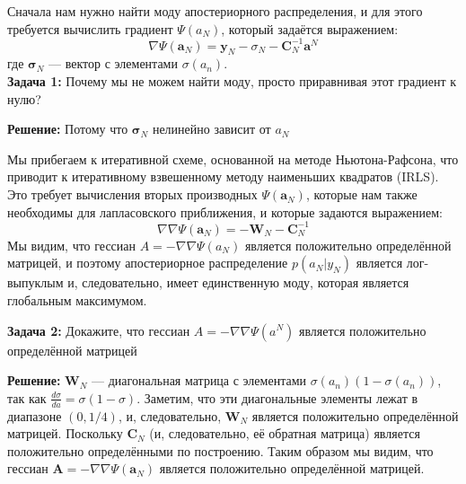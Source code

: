 {Сначала нам нужно найти моду апостериорного распределения, и для этого требуется вычислить градиент $\Psi(a_N)$, который задаётся выражением:
\[
    \nabla \Psi(\mathbf{a}_N) = \mathbf{y}_N - \sigma_{N} - \mathbf{C}_{N}^{-1}\mathbf{a}^N
\]
где $\mathbf{\sigma}_N$ — вектор с элементами $\sigma(a_n)$. \\

\textbf{Задача 1:}
Почему мы не можем найти моду, просто приравнивая этот градиент к нулю?

\textbf{Решение:}
Потому что $\mathbf{\sigma}_N$ нелинейно зависит от $a_N$

Мы прибегаем к итеративной схеме, основанной на методе Ньютона-Рафсона, что приводит к итеративному взвешенному методу наименьших квадратов (IRLS). Это требует вычисления вторых производных $\Psi(\mathbf{a}_N)$, которые нам также необходимы для лапласовского приближения, и которые задаются выражением:
\[
    \nabla \nabla \Psi(\mathbf{a}_N) = -\mathbf{W}_{N} - \mathbf{C}_{N}^{-1}
\]
Мы видим, что гессиан $A=-\nabla \nabla \Psi(a_N)$ является положительно определённой матрицей, и поэтому апостериорное распределение $p(a_N|y_N)$ является лог-выпуклым и, следовательно, имеет единственную моду, которая является глобальным максимумом.

\textbf{Задача 2:}
Докажите, что гессиан $A=-\nabla \nabla \Psi(a^N)$ является положительно определённой матрицей


\textbf{Решение:}
$\mathbf{W}_{N}$ — диагональная матрица с элементами $\sigma(a_n)(1-\sigma(a_n))$, так как $\frac{d\sigma}{da}=\sigma(1-\sigma)$. Заметим, что эти диагональные элементы лежат в диапазоне $(0, 1/4)$, и, следовательно, $\mathbf{W}_{N}$ является положительно определённой матрицей. Поскольку $\mathbf{C}_N$ (и, следовательно, её обратная матрица) является положительно определёнными по построению. Таким образом мы видим, что гессиан $\mathbf{A}=-\nabla \nabla \Psi(\mathbf{a}_N)$ является положительно определённой матрицей.


}
